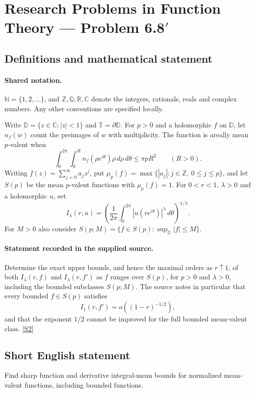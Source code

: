\documentclass[11pt]{article}
\newcommand{\sref}[2]{\hyperlink{source:#1:#2}{[S#2]}}
\begin{document}
\section{Research Problems in Function Theory — Problem 6.8$\prime$}\label{statement}

\subsection{Definitions and mathematical statement}

\paragraph{Shared notation.}$\mathbb N=\{1,2,\ldots\}$, and $\mathbb Z,\mathbb Q,\mathbb R,\mathbb C$ denote the integers, rationals, reals and complex numbers. Any other conventions are specified locally.


Write $\mathbb D=\{z\in\mathbb C:|z|<1\}$ and $\mathbb T=\partial\mathbb D$. For $p>0$ and a holomorphic $f$ on $\mathbb D$, let $n_f(w)$ count the preimages of $w$ with multiplicity. The function is areally mean $p$-valent when
\[\int_0^{2\pi}\int_0^R n_f(\rho e^{i\theta})\rho\,d\rho\,d\theta\leq\pi pR^2\qquad(R>0).\]
Writing $f(z)=\sum_{j=0}^{\infty}a_jz^j$, put $\mu_p(f)=\max\{|a_j|:j\in\mathbb Z,\ 0\leq j\leq p\}$, and let $S(p)$ be the mean $p$-valent functions with $\mu_p(f)=1$.
For $0<r<1$, $\lambda>0$ and a holomorphic $u$, set
\[I_\lambda(r,u)=\left(\frac1{2\pi}\int_0^{2\pi}|u(re^{i\theta})|^\lambda\,d\theta\right)^{1/\lambda}.\]
For $M>0$ also consider $S(p;M)=\{f\in S(p):\sup_{\mathbb D}|f|\leq M\}$.
\paragraph{Statement recorded in the supplied source.}
Determine the exact upper bounds, and hence the maximal orders as $r\uparrow1$, of both $I_\lambda(r,f)$ and $I_\lambda(r,f')$ as $f$ ranges over $S(p)$, for $p>0$ and $\lambda>0$, including the bounded subclasses $S(p;M)$. The source notes in particular that every bounded $f\in S(p)$ satisfies
\[I_1(r,f')=o((1-r)^{-1/2}),\]
and that the exponent $1/2$ cannot be improved for the full bounded mean-valent class. \sref{statement}{2}
\subsection{Short English statement}
Find sharp function and derivative integral-mean bounds for normalized mean-valent functions, including bounded functions.
\end{document}

